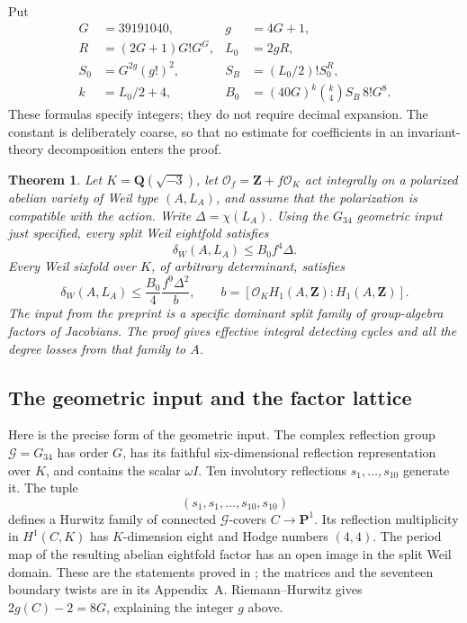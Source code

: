 \documentclass[11pt]{article}
\newtheorem{theorem}{Theorem}[section]
\theoremstyle{definition}
\theoremstyle{remark}
\newcommand{\Q}{\mathbf Q}
\newcommand{\Z}{\mathbf Z}
\begin{document}
Put
\begin{align*}
 G&=39191040,& g&=4G+1,\\
 R&=(2G+1)G!G^G,& L_0&=2gR,\\
 S_0&=G^{2g}(g!)^2,& S_B&=(L_0/2)!S_0^R,\\
 k&=L_0/2+4,&
 B_0&=(40G)^k\binom{k}{4}S_B\,8!G^8.
\end{align*}
These formulas specify integers; they do not require decimal expansion.
The constant is deliberately coarse, so that no estimate for coefficients
in an invariant-theory decomposition enters the proof.

\begin{theorem}\label{thm:eisenstein-eightfolds}
Let $K=\Q(\sqrt{-3})$, let $\mathcal O_f=\Z+f\mathcal O_K$ act
integrally on a polarized abelian variety of Weil type $(A,L_A)$, and
assume that the polarization is compatible with the action. Write
$\Delta=\chi(L_A)$. Using the $G_{34}$ geometric input just specified,
every split Weil eightfold satisfies
\[
 \delta_W(A,L_A)\le B_0 f^4\Delta.
\]
Every Weil sixfold over $K$, of arbitrary determinant, satisfies
\[
 \delta_W(A,L_A)\le \frac{B_0}{4}
          \frac{f^9\Delta^2}{b},
 \qquad b=[\mathcal O_K H_1(A,\Z):H_1(A,\Z)].
\]
The input from the preprint is a specific dominant split family of
group-algebra factors of Jacobians. The proof gives effective integral
detecting cycles and all the degree losses from that family to $A$.
\end{theorem}

\subsection{The geometric input and the factor lattice}

Here is the precise form of the geometric input. The complex reflection
group $\mathcal G=G_{34}$ has order $G$, has its faithful six-dimensional
reflection representation over $K$, and contains the scalar $\omega I$.
Ten involutory reflections $s_1,\ldots,s_{10}$ generate it. The tuple
\[
 (s_1,s_1,\ldots,s_{10},s_{10})
\]
defines a Hurwitz family of connected $\mathcal G$-covers
$C\to\mathbf P^1$. Its reflection multiplicity in $H^1(C,K)$ has
$K$-dimension eight and Hodge numbers $(4,4)$. The period map of the
resulting abelian eightfold factor has an open image in the split Weil
domain. These are the statements proved in \cite[\S9]{Severn}; the
matrices and the seventeen boundary twists are in its Appendix~A.
Riemann--Hurwitz gives $2g(C)-2=8G$, explaining the integer $g$ above.
\end{document}
